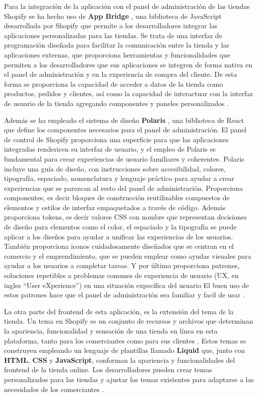 \documentclass[12pt]{article}
\begin{document}
Para la integración de la aplicación con el panel de administración de las tiendas Shopify se ha hecho uso de \textbf{App Bridge} \cite{app-bridge}, una biblioteca de JavaScript
desarrollada por Shopify que permite a los desarrolladores integrar las aplicaciones personalizadas para las tiendas. Se trata de una interfaz
de programación diseñada para facilitar la comunicación entre la tienda y las aplicaciones externas, que proporciona herramientas y funcionalidades
que permiten a los desarrolladores que sus aplicaciones se integren de forma nativa en el panel de administración y en la experiencia de compra
del cliente. De esta forma se proporciona la capacidad de acceder a datos de la tienda como productos, pedidos y clientes, así como la capacidad de interactuar con la interfaz
de usuario de la tienda agregando componentes y paneles personalizados \cite{shopify-dev}. 

Además se ha empleado el sistema de diseño \textbf{Polaris} \cite{polaris}, una biblioteca de React que define los componentes necesarios para el panel de administración.
El panel de control de Shopify proporciona una superficie para que las aplicaciones integradas rendericen su interfaz de usuario, y el empleo de Polaris
es fundamental para crear experiencias de usuario familiares y coherentes.
Polaris incluye una guía de diseño, con instrucciones sobre accesibilidad, colores, tipografía, espaciado, nomenclatura y lenguaje práctico para ayudar 
a crear experiencias que se parezcan al resto del panel de administración. Proporciona componentes, es decir bloques de construcción reutilizables compuestos de 
elementos y estilos de interfaz empaquetados a través de código. Además proporciona tokens, es decir valores CSS con nombre que representan decisiones
de diseño para elementos como el color, el espaciado y la tipografía se puede aplicar a los diseños para ayudar a unificar las experiencias de los usuarios.
También proporciona iconos cuidadosamente diseñados que se centran en el comercio y el emprendimiento, que se pueden emplear como ayudas visuales para ayudar a los 
usuarios a completar tareas. Y por último proporciona patrones, soluciones repetibles a problemas comunes de experiencia de usuario (UX, en ingles ``User eXperience'') en una situación expecífica del usuario
El buen uso de estos patrones hace que el panel de administración sea familiar y facil de usar \cite{shopify-dev}.

La otra parte del frontend de esta aplicación, es la extensión del tema de la tienda. Un tema en Shopify es un conjunto de recursos
y archivos que determinan la apariencia, funcionalidad y sensación de una tienda en línea en esta plataforma, tanto para los comerciantes como para
sus clientes \cite{theme}. Estos temas se construyen empleando un lenguaje de plantillas llamado \textbf{Liquid} \cite{liquid} que, junto con \textbf{HTML}, \textbf{CSS} y \textbf{JavaScript}, conforman la apariencia
y funcionalidades del frontend de la tienda online. Los desarrolladores pueden crear temas personalizados para las tiendas y ajustar los temas existentes 
para adaptarse a las necesidades de los comerciantes \cite{shopify-dev}. 
\end{document}
